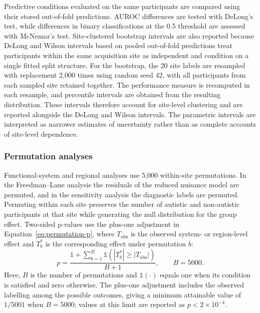 Predictive conditions evaluated on the same participants are compared using their stored out-of-fold predictions. AUROC differences are tested with DeLong's test, while differences in binary classifications at the 0.5 threshold are assessed with McNemar's test. Site-clustered bootstrap intervals are also reported because DeLong and Wilson intervals based on pooled out-of-fold predictions treat participants within the same acquisition site as independent and condition on a single fitted split structure. For the bootstrap, the 20 site labels are resampled with replacement 2,000 times using random seed 42, with all participants from each sampled site retained together. The performance measure is recomputed in each resample, and percentile intervals are obtained from the resulting distribution. These intervals therefore account for site-level clustering and are reported alongside the DeLong and Wilson intervals. The parametric intervals are interpreted as narrower estimates of uncertainty rather than as complete accounts of site-level dependence.

\subsubsection{Permutation analyses}
\label{subsubsec:permutation-analyses}

Functional-system and regional analyses use 5,000 within-site permutations. In the Freedman--Lane analysis the residuals of the reduced nuisance model are permuted, and in the sensitivity analysis the diagnostic labels are permuted. Permuting within each site preserves the number of autistic and non-autistic participants at that site while generating the null distribution for the group effect. Two-sided p-values use the plus-one adjustment in Equation~\eqref{eq:permutation-p}, where $T_{\mathrm{obs}}$ is the observed system- or region-level effect and $T_b^\ast$ is the corresponding effect under permutation $b$:
\begin{equation}
p
=
\frac{
1
+
\sum_{b=1}^{B}
\mathbb{1}\left(
\left|T_b^\ast\right|
\geq
\left|T_{\mathrm{obs}}\right|
\right)
}{
B+1
},
\qquad B=5000.
\label{eq:permutation-p}
\end{equation}
Here, $B$ is the number of permutations and $\mathbb{1}(\cdot)$ equals one when its condition is satisfied and zero otherwise. The plus-one adjustment includes the observed labelling among the possible outcomes, giving a minimum attainable value of $1/5001$ when $B=5000$; values at this limit are reported as $p < 2\times10^{-4}$.

